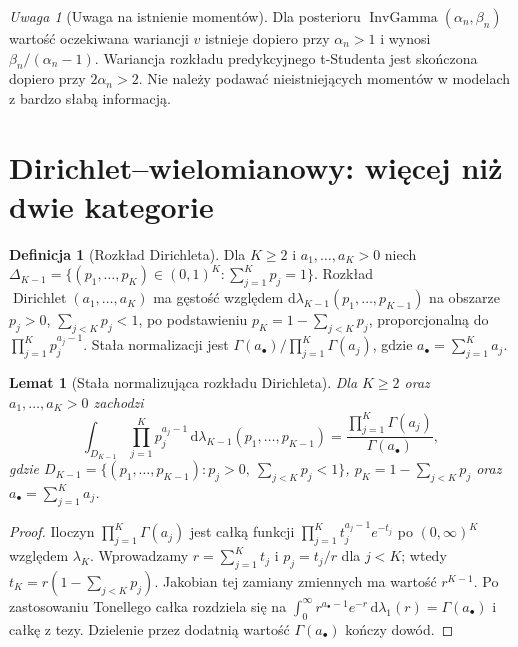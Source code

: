 \documentclass[11pt,a4paper,oneside]{report}
\numberwithin{equation}{chapter}
\theoremstyle{plain}
\newtheorem{lemat}[twierdzenie]{Lemat}
\theoremstyle{definition}
\newtheorem{definicja}{Definicja}[chapter]
\theoremstyle{remark}
\newtheorem{uwaga}{Uwaga}[chapter]
\newcommand{\dd}{\mathrm d}
\begin{document}
\begin{uwaga}[Uwaga na istnienie momentów]
Dla posterioru $\operatorname{InvGamma}(\alpha_n,\beta_n)$
wartość oczekiwana wariancji $v$ istnieje dopiero przy
$\alpha_n>1$ i wynosi $\beta_n/(\alpha_n-1)$.
Wariancja rozkładu predykcyjnego t-Studenta jest skończona
dopiero przy $2\alpha_n>2$. Nie należy podawać nieistniejących
momentów w modelach z bardzo słabą informacją.
\end{uwaga}

\section{Dirichlet--wielomianowy: więcej niż dwie kategorie}
\begin{definicja}[Rozkład Dirichleta]
Dla $K\ge2$ i $a_1,\ldots,a_K>0$ niech
$\Delta_{K-1}=\{(p_1,\ldots,p_K)\in(0,1)^K:\sum_{j=1}^Kp_j=1\}$.
Rozkład $\operatorname{Dirichlet}(a_1,\ldots,a_K)$ ma
gęstość względem $\dd\lambda_{K-1}(p_1,\ldots,p_{K-1})$
na obszarze $p_j>0$, $\sum_{j<K}p_j<1$, po podstawieniu
$p_K=1-\sum_{j<K}p_j$, proporcjonalną do
$\prod_{j=1}^Kp_j^{a_j-1}$. Stała normalizacji jest
$\Gamma(a_\bullet)/\prod_{j=1}^K\Gamma(a_j)$,
gdzie $a_\bullet=\sum_{j=1}^Ka_j$.
\end{definicja}

\begin{lemat}[Stała normalizująca rozkładu Dirichleta]
Dla $K\ge2$ oraz $a_1,\ldots,a_K>0$ zachodzi
\[
 \int_{D_{K-1}}\prod_{j=1}^{K}p_j^{a_j-1}
 \,\dd\lambda_{K-1}(p_1,\ldots,p_{K-1})
 =\frac{\prod_{j=1}^K\Gamma(a_j)}{\Gamma(a_\bullet)},
\]
gdzie $D_{K-1}=\{(p_1,\ldots,p_{K-1}):p_j>0,
\ \sum_{j<K}p_j<1\}$, $p_K=1-\sum_{j<K}p_j$ oraz
$a_\bullet=\sum_{j=1}^Ka_j$.
\end{lemat}
\begin{proof}
Iloczyn $\prod_{j=1}^K\Gamma(a_j)$ jest całką funkcji
$\prod_{j=1}^Kt_j^{a_j-1}e^{-t_j}$ po $(0,\infty)^K$
względem $\lambda_K$. Wprowadzamy
$r=\sum_{j=1}^Kt_j$ i $p_j=t_j/r$ dla $j<K$;
wtedy $t_K=r(1-\sum_{j<K}p_j)$.
Jakobian tej zamiany zmiennych ma wartość $r^{K-1}$.
Po zastosowaniu Tonellego całka rozdziela się na
$\int_0^\infty r^{a_\bullet-1}e^{-r}\,\dd\lambda_1(r)
=\Gamma(a_\bullet)$ i całkę z tezy. Dzielenie
przez dodatnią wartość $\Gamma(a_\bullet)$ kończy dowód.
\end{proof}
\end{document}
